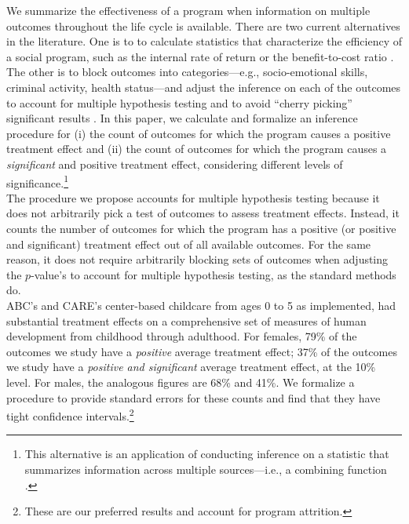 \noindent We summarize the effectiveness of a program when information on multiple outcomes throughout the life cycle is available. There are two current alternatives in the literature. One is to to calculate statistics that characterize the efficiency of a social program, such as the internal rate of return or the benefit-to-cost ratio \citep{Heckman_Moon_etal_2010_RateofReturn}. The other is to block outcomes into categories---e.g., socio-emotional skills, criminal activity, health status---and adjust the inference on each of the outcomes to account for multiple hypothesis testing and to avoid ``cherry picking'' significant results \citep{Lehman_Romano_2005_AnnStat,Lehmann_Romano_2005_testing,Heckman_Moon_etal_2010_QE}. In this paper, we calculate and formalize an inference procedure for (i) the count of outcomes for which the program causes a positive treatment effect and (ii) the count of outcomes for which the program causes a \emph{significant} and positive treatment effect, considering different levels of significance.\footnote{This alternative is an application of conducting inference on a statistic that summarizes information across multiple sources---i.e., a combining function \citep{Pesarin_Salmaso_2010_PermutationTests}.}\\

\noindent The procedure we propose accounts for multiple hypothesis testing because it does not arbitrarily pick a test of outcomes to assess treatment effects. Instead, it counts the number of outcomes for which the program has a positive (or positive and significant) treatment effect out of all available outcomes. For the same reason, it does not require arbitrarily blocking sets of outcomes when adjusting the $p$-value's to account for multiple hypothesis testing, as the standard methods do.\\

\noindent ABC's and CARE's center-based childcare from ages 0 to 5 as implemented, had substantial treatment effects on a comprehensive set of measures of human development from childhood through adulthood. For females, 79\% of the outcomes we study have a \textit{positive} average treatment effect; 37\% of the outcomes we study have a \textit{positive and significant} average treatment effect, at the 10\% level. For males, the analogous figures are 68\% and 41\%. We formalize a procedure to provide standard errors for these counts and find that they have tight confidence intervals.\footnote{These are our preferred results and account for program attrition.}\\


